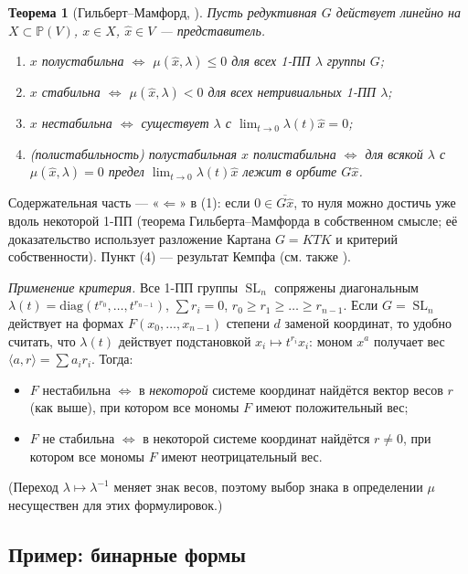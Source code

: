 \documentclass[11pt,a4paper]{article}
\theoremstyle{plain}
\newtheorem{theorem}{Теорема}[section]
\theoremstyle{definition}
\theoremstyle{remark}
\newcommand{\PP}{\mathbb{P}}
\DeclareMathOperator{\SL}{SL}
\begin{document}
\begin{theorem}[{Гильберт--Мамфорд, \cite[2.1]{MFK}}]\label{thm:HM}
Пусть редуктивная $G$ действует линейно на $X\subset\PP(V)$, $x\in X$, $\hat x\in V$ --- представитель.
\begin{enumerate}
\item $x$ полустабильна $\iff$ $\mu(\hat x,\lambda)\le0$ для всех 1-ПП $\lambda$ группы $G$;
\item $x$ стабильна $\iff$ $\mu(\hat x,\lambda)<0$ для всех нетривиальных 1-ПП $\lambda$;
\item $x$ нестабильна $\iff$ существует $\lambda$ с $\lim_{t\to0}\lambda(t)\hat x=0$;
\item \textup{(}\emph{полистабильность}\textup{)} полустабильная $x$ полистабильна $\iff$ для всякой $\lambda$ с
$\mu(\hat x,\lambda)=0$ предел $\lim_{t\to0}\lambda(t)\hat x$ лежит в орбите $G\hat x$.
\end{enumerate}
\end{theorem}

Содержательная часть --- «$\Leftarrow$» в (1): если $0\in\overline{G\hat x}$, то нуля можно
достичь уже вдоль некоторой 1-ПП (теорема Гильберта--Мамфорда в собственном смысле; её
доказательство использует разложение Картана $G=KTK$ и критерий собственности). Пункт (4) ---
результат Кемпфа \cite{Kempf} (см. также \cite{BMRT}).

\emph{Применение критерия.} Все 1-ПП группы $\SL_{n}$ сопряжены диагональным
$\lambda(t)=\mathrm{diag}(t^{r_0},\dots,t^{r_{n-1}})$, $\sum r_i=0$, $r_0\ge r_1\ge\dots\ge r_{n-1}$.
Если $G=\SL_n$ действует на формах $F(x_0,\dots,x_{n-1})$ степени $d$ заменой координат, то
удобно считать, что $\lambda(t)$ действует подстановкой $x_i\mapsto t^{r_i}x_i$: моном $x^a$
получает вес $\langle a,r\rangle=\sum a_ir_i$. Тогда:
\begin{itemize}
\item $F$ нестабильна $\iff$ в \emph{некоторой} системе координат найдётся вектор весов $r$ (как
выше), при котором все мономы $F$ имеют положительный вес;
\item $F$ не стабильна $\iff$ в некоторой системе координат найдётся $r\ne0$, при котором все мономы
$F$ имеют неотрицательный вес.
\end{itemize}
(Переход $\lambda\mapsto\lambda^{-1}$ меняет знак весов, поэтому выбор знака в определении $\mu$
несуществен для этих формулировок.)

\subsection{Пример: бинарные формы}
\end{document}
